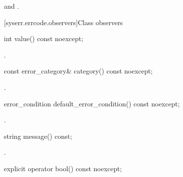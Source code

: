 \begin{itemdescr}
\pnum
\postconditions {} and .
\end{itemdescr}


[syserr.errcode.observers]{Class  observers}

\begin{itemdecl}
int value() const noexcept;
\end{itemdecl}

\begin{itemdescr}
\pnum
\returns {}.
\end{itemdescr}

\begin{itemdecl}
const error_category& category() const noexcept;
\end{itemdecl}

\begin{itemdescr}
\pnum
\returns {}.
\end{itemdescr}

\begin{itemdecl}
error_condition default_error_condition() const noexcept;
\end{itemdecl}

\begin{itemdescr}
\pnum
\returns {}.
\end{itemdescr}

\begin{itemdecl}
string message() const;
\end{itemdecl}

\begin{itemdescr}
\pnum
\returns {}.
\end{itemdescr}

\begin{itemdecl}
explicit operator bool() const noexcept;
\end{itemdecl}

